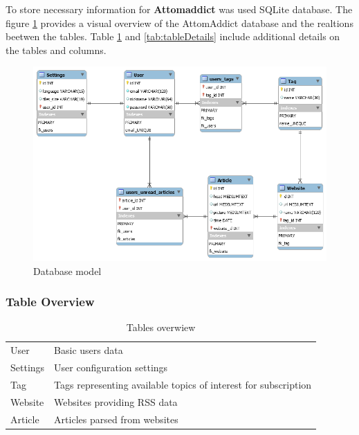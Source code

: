 \documentclass[12pt]{article}
\begin{document}
To store necessary information for \textbf{Attomaddict} was used SQLite database. The figure \ref{fig:databaseModel} provides a visual overview of the AttomAddict database and the realtions beetwen the tables. Table \ref{tab:tablesOverwiew} and \ref{tab:tableDetails} include additional details on the tables and columns.

\begin{figure}[H]
	\includegraphics[width=\textwidth]{images/atomAddictDataBase.png}
	\caption{Database model}
	\label{fig:databaseModel}
\end{figure}

\subsubsection{Table Overview}

\begin{table}[H]
\centering
	\begin{tabular}{p{5cm}p{9cm}}  \hline
	\rowcolor{blue!20!black!30!green}\multicolumn{2}{|c|}{\textbf{AttomAddict Tables Overwiew}} \\ \hline \hline
	User 	  & 		Basic users data						 		\\ \hline
	Settings  & 		User configuration settings 				\\ \hline
	Tag 	  &  		Tags representing available topics of interest for subscription	\\ \hline
	Website   & 		Websites providing RSS data										 \\ \hline
	Article	  & 		Articles parsed from websites 									\\ \hline

	\end{tabular}
	\caption{Tables overwiew}
	\label{tab:tablesOverwiew}
\end{table}
\end{document}
